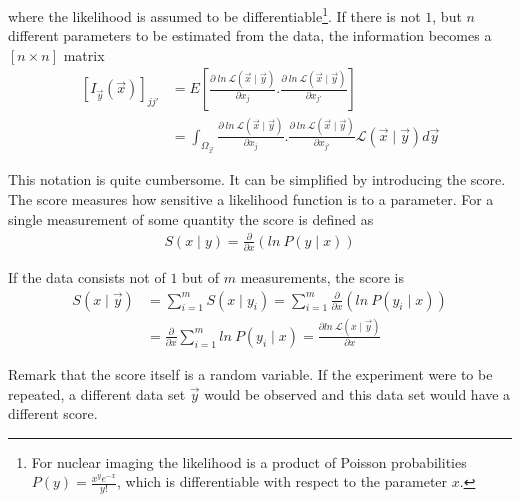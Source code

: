 \documentclass[report,12pt]{report}
\begin{document}
where the likelihood is assumed to be differentiable\footnote{For nuclear imaging the likelihood is a product of Poisson probabilities $P(y) = \frac{x^y e^{-x}}{y!}$, which is differentiable with respect to the parameter $x$.}. If there is not $1$, but $n$ different parameters to be estimated from the data, the information becomes a $[n \times n]$ matrix
\begin{align}
	\left[ I_{\vec y} (\vec x) \right]_{jj'} &= 
	E\left[\frac{\partial\ ln\ \mathcal{L} \left( \vec x \mid \vec y \right)}
	{\partial x_j}.
	\frac{\partial\ ln\ \mathcal{L} \left( \vec x \mid \vec y \right)}
	{\partial x_{j'}} \right]
	\nonumber\\
	&= \int_{\Omega_{\vec x}} 
	\frac{\partial\ ln\ \mathcal{L} \left( \vec x \mid \vec y \right)}
	{\partial x_j}.
	\frac{\partial\ ln\ \mathcal{L} \left( \vec x \mid \vec y \right)}
	{\partial x_{j'}} \mathcal{L} \left( \vec x \mid \vec y \right) d\vec y
	\label{eq:fisherInformation}
\end{align}

This notation is quite cumbersome. It can be simplified by introducing the score. The score measures how sensitive a likelihood function is to a parameter. For a single measurement of some quantity the score is defined as
\begin{align}
	S(x \mid y) = \frac{\partial}{\partial x}\left( ln\ P(y \mid x) \right)
\end{align}

If the data consists not of $1$ but of $m$ measurements, the score is
\begin{align}
	S(x \mid \vec y) &= \sum_{i=1}^{m} S(x \mid y_i )
	= \sum_{i=1}^{m} \frac{\partial}{\partial x} (ln\ P(y_i \mid x))
	\nonumber\\
	&= \frac{\partial}{\partial x} \sum_{i=1}^{m} ln\ P(y_i \mid x)
	= \frac{\partial ln\ \mathcal{L}(x \mid \vec y)}{\partial x}
\end{align}

Remark that the score itself is a random variable. If the experiment were to be repeated, a different data set $\vec y$ would be observed and this data set would have a different score. 
\end{document}
